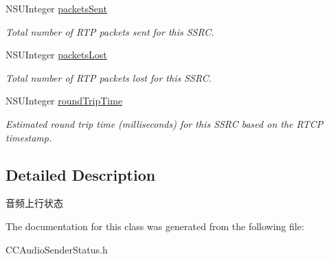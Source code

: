 \begin{DoxyCompactItemize}
N\+S\+U\+Integer \hyperlink{interface_c_c_audio_sender_status_a9e9866fce7dea5689a3ddaa27f112ffb}{packets\+Sent}
\begin{DoxyCompactList}\small\item\em Total number of R\+TP packets sent for this S\+S\+RC. \end{DoxyCompactList}\item 
\mbox{\label{interface_c_c_audio_sender_status_ae09ed16fd916635b197a3e5ab98ff311}} 
N\+S\+U\+Integer \hyperlink{interface_c_c_audio_sender_status_ae09ed16fd916635b197a3e5ab98ff311}{packets\+Lost}
\begin{DoxyCompactList}\small\item\em Total number of R\+TP packets lost for this S\+S\+RC. \end{DoxyCompactList}\item 
\mbox{\label{interface_c_c_audio_sender_status_a6a002f80b10eba436bedc6314cb64ae2}} 
N\+S\+U\+Integer \hyperlink{interface_c_c_audio_sender_status_a6a002f80b10eba436bedc6314cb64ae2}{round\+Trip\+Time}
\begin{DoxyCompactList}\small\item\em Estimated round trip time (milliseconds) for this S\+S\+RC based on the R\+T\+CP timestamp. \end{DoxyCompactList}\end{DoxyCompactItemize}


\subsection{Detailed Description}
音频上行状态 

The documentation for this class was generated from the following file\+:\begin{DoxyCompactItemize}
\item 
C\+C\+Audio\+Sender\+Status.\+h\end{DoxyCompactItemize}
